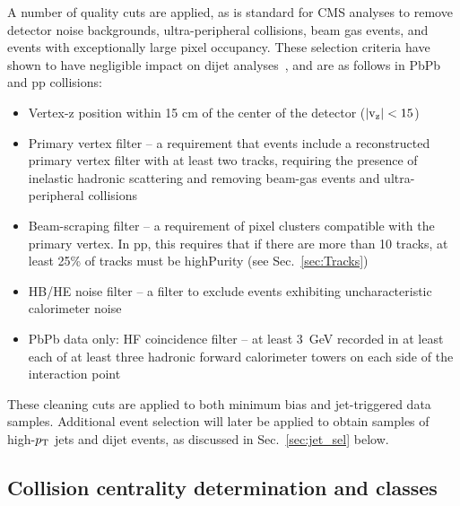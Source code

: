 A number of quality cuts are applied, as is standard for CMS analyses to remove detector noise backgrounds, ultra-peripheral collisions, beam gas events, and events with exceptionally large pixel occupancy. These selection criteria have shown to have negligible impact on dijet analyses~\cite{Chatrchyan:2012gt,Chatrchyan:2012gw}, and are as follows in PbPb and pp collisions: 
\begin{itemize}
\item Vertex-z position within 15 cm of the center of the detector ($|\rm v_{z}| < 15$)
\item Primary vertex filter -- a requirement that events include a reconstructed primary vertex filter with at least two tracks, requiring the presence of inelastic hadronic scattering and removing beam-gas events and ultra-peripheral collisions
\item Beam-scraping filter -- a requirement of pixel clusters compatible with the primary vertex.  In pp, this requires that if there are more than 10 tracks, at least 25\% of tracks must be highPurity (see Sec.~\ref{sec:Tracks})
\item HB/HE noise filter -- a filter to exclude events exhibiting uncharacteristic calorimeter noise~\cite{Chatrchyan:2009hy}
\item PbPb data only:  HF coincidence filter -- at least 3~GeV recorded in at least each of at least three hadronic forward calorimeter towers on each side of the interaction point
\end{itemize}

\noindent These cleaning cuts are applied to both minimum bias and jet-triggered data samples.  Additional event selection will later be applied to obtain samples of high-$p_{\rm T}$ jets and dijet events, as discussed in Sec.~\ref{sec:jet_sel} below. 



\subsection{Collision centrality determination and classes}
\label{sec:centrality}

